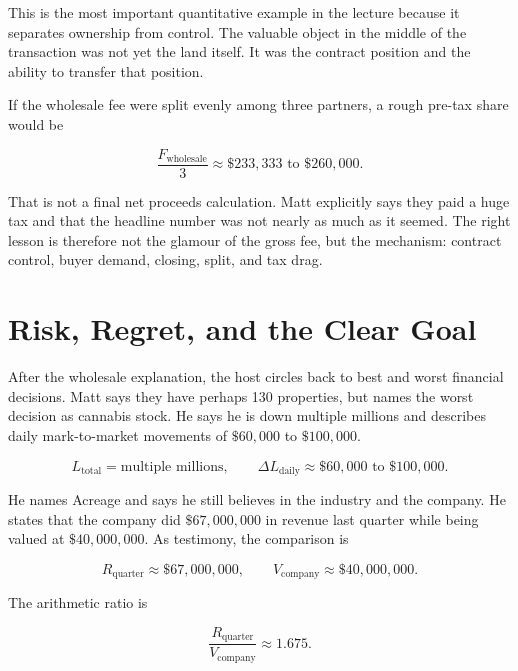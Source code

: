This is the most important quantitative example in the lecture because it separates ownership from control. The valuable object in the middle of the transaction was not yet the land itself. It was the contract position and the ability to transfer that position.

If the wholesale fee were split evenly among three partners, a rough pre-tax share would be

\begin{equation}
\frac{F_{\text{wholesale}}}{3}
\approx
\$233{,}333 \text{ to } \$260{,}000.
\end{equation}

That is not a final net proceeds calculation. Matt explicitly says they paid a huge tax and that the headline number was not nearly as much as it seemed. The right lesson is therefore not the glamour of the gross fee, but the mechanism: contract control, buyer demand, closing, split, and tax drag.

\section{Risk, Regret, and the Clear Goal}

After the wholesale explanation, the host circles back to best and worst financial decisions. Matt says they have perhaps 130 properties, but names the worst decision as cannabis stock. He says he is down multiple millions and describes daily mark-to-market movements of \(\$60{,}000\) to \(\$100{,}000\).

\begin{equation}
L_{\text{total}}=\text{multiple millions},
\qquad
\Delta L_{\text{daily}}\approx \$60{,}000\text{ to }\$100{,}000.
\end{equation}

He names Acreage and says he still believes in the industry and the company. He states that the company did \(\$67{,}000{,}000\) in revenue last quarter while being valued at \(\$40{,}000{,}000\). As testimony, the comparison is

\begin{equation}
R_{\text{quarter}}\approx \$67{,}000{,}000,
\qquad
V_{\text{company}}\approx \$40{,}000{,}000.
\end{equation}

The arithmetic ratio is

\begin{equation}
\frac{R_{\text{quarter}}}{V_{\text{company}}}
\approx
1.675.
\end{equation}

